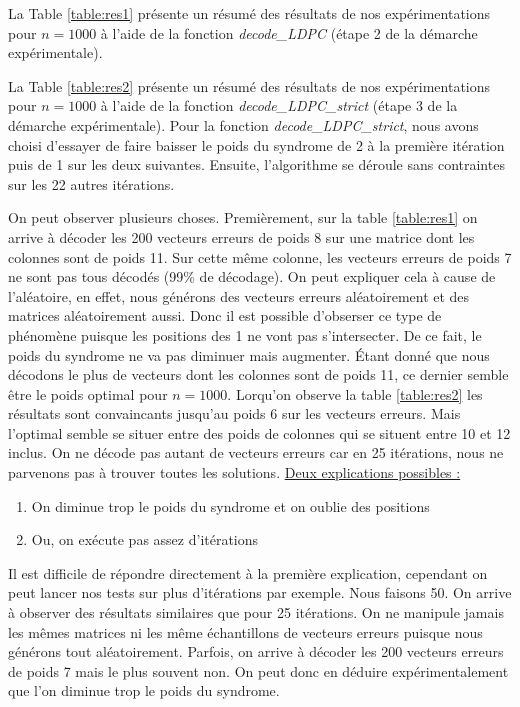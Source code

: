 \documentclass[french,nochapter,11pt]{rapportUB}
\begin{document}
La Table \ref{table:res1} présente un résumé des résultats de nos expérimentations pour $n=1000$ à l'aide de la fonction
\textit{decode\_LDPC} (étape 2 de la démarche expérimentale). 

La Table \ref{table:res2} présente un résumé des résultats de nos expérimentations pour $n=1000$ à l'aide de la fonction
\textit{decode\_LDPC\_strict} (étape 3 de la démarche expérimentale). 
Pour la fonction \textit{decode\_LDPC\_strict}, nous avons choisi d'essayer de faire baisser le poids du syndrome de 2 à la première itération puis de 1 sur les 
deux suivantes. Ensuite, l'algorithme se déroule sans contraintes sur les 22 autres itérations.

\vspace{0.4cm}
On peut observer plusieurs choses. Premièrement, sur la table \ref{table:res1} on arrive à décoder les 200 vecteurs erreurs de poids 
8 sur une matrice dont les colonnes sont de poids 11. Sur cette même colonne, les vecteurs erreurs de poids 7 ne sont pas tous décodés (99\% de décodage).
On peut expliquer cela à cause de l'aléatoire, en effet, nous générons des vecteurs erreurs aléatoirement et des matrices aléatoirement aussi.
Donc il est possible d'obserser ce type de phénomène puisque les positions des 1 ne vont pas s'intersecter. De ce fait,
le poids du syndrome ne va pas diminuer mais augmenter.\newline
Étant donné que nous décodons le plus de vecteurs dont les colonnes sont de poids 11, ce dernier semble être le poids optimal
pour $n = 1000$. Lorqu'on observe la table \ref{table:res2} les résultats sont convaincants jusqu'au poids 6 sur les vecteurs erreurs.
Mais l'optimal semble se situer entre des poids de colonnes qui se situent entre 10 et 12 inclus. On ne décode pas autant de vecteurs erreurs
car en 25 itérations, nous ne parvenons pas à trouver toutes les solutions.
\clearpage
\underline{Deux explications possibles :}
\begin{enumerate}
  \item On diminue trop le poids du syndrome et on oublie des positions
  \item Ou, on exécute pas assez d'itérations
\end{enumerate}

Il est difficile de répondre directement à la première explication, cependant on peut lancer nos tests sur plus d'itérations par exemple.
Nous faisons 50. On arrive à observer des résultats similaires que pour 25 itérations. On ne manipule jamais les mêmes matrices ni les même échantillons de vecteurs erreurs
puisque nous générons tout aléatoirement. Parfois, on arrive à décoder les 200 vecteurs erreurs de poids 7 mais le plus souvent non.
On peut donc en déduire expérimentalement que l'on diminue trop le poids du syndrome.\vspace{0.4cm}\newline
\end{document}
